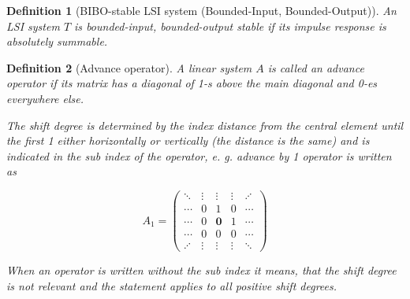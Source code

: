 \documentclass[a4paper]{article}
\theoremstyle{break}
\newtheorem{definition}{Definition}[section]
\theoremstyle{break}
\begin{document}
\begin{definition}[BIBO-stable LSI system (Bounded-Input, Bounded-Output)]
  An LSI system $T$ is \textit{bounded-input, bounded-output stable} if its impulse response is absolutely summable.
\end{definition}

\begin{definition}[Advance operator]
  A linear system $A$ is called an \textit{advance} operator if its matrix has a diagonal of 1-s above the main diagonal and 0-es everywhere else.

  The shift degree is determined by the index distance from the central element until the first 1 either horizontally or vertically (the distance is the same) and is indicated in the sub index of the operator, e. g. advance by 1 operator is written as

  \begin{equation*}
    A_{1} = \begin{pmatrix*}
          \ddots  & \vdots & \vdots         & \vdots & \iddots \\
          \cdots  & 0      & 1              & 0      & \cdots \\
          \cdots  & 0      & \boldsymbol{0} & 1      & \cdots \\
          \cdots  & 0      & 0              & 0      & \cdots \\
          \iddots & \vdots & \vdots         & \vdots & \ddots
        \end{pmatrix*}
  \end{equation*}

  When an operator is written without the sub index it means, that the shift degree is not relevant and the statement applies to all positive shift degrees.
\end{definition}
\end{document}
